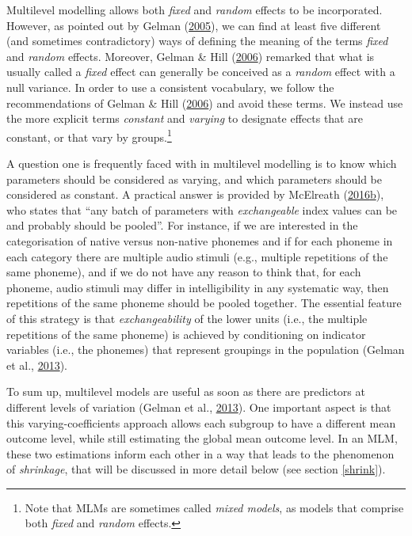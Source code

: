 \documentclass[a4paper,12pt,twoside,onecolumn,openright,final,oldfontcommands]{memoir}
\let\rmarkdownfootnote\footnote%
\def\footnote{\protect\rmarkdownfootnote}
\begin{document}
Multilevel modelling allows both \emph{fixed} and \emph{random} effects to be incorporated. However, as pointed out by Gelman (\protect\hyperlink{ref-gelman_analysis_2005}{2005}), we can find at least five different (and sometimes contradictory) ways of defining the meaning of the terms \emph{fixed} and \emph{random} effects. Moreover, Gelman \& Hill (\protect\hyperlink{ref-gelman_data_2006}{2006}) remarked that what is usually called a \emph{fixed} effect can generally be conceived as a \emph{random} effect with a null variance. In order to use a consistent vocabulary, we follow the recommendations of Gelman \& Hill (\protect\hyperlink{ref-gelman_data_2006}{2006}) and avoid these terms. We instead use the more explicit terms \emph{constant} and \emph{varying} to designate effects that are constant, or that vary by groups.\footnote{Note that MLMs are sometimes called \emph{mixed models}, as models that comprise both \emph{fixed} and \emph{random} effects.}

A question one is frequently faced with in multilevel modelling is to know which parameters should be considered as varying, and which parameters should be considered as constant. A practical answer is provided by McElreath (\protect\hyperlink{ref-mcelreath_statistical_2016}{2016}\protect\hyperlink{ref-mcelreath_statistical_2016}{b}), who states that \enquote{any batch of parameters with \emph{exchangeable} index values can be and probably should be pooled}. For instance, if we are interested in the categorisation of native versus non-native phonemes and if for each phoneme in each category there are multiple audio stimuli (e.g., multiple repetitions of the same phoneme), and if we do not have any reason to think that, for each phoneme, audio stimuli may differ in intelligibility in any systematic way, then repetitions of the same phoneme should be pooled together. The essential feature of this strategy is that \emph{exchangeability} of the lower units (i.e., the multiple repetitions of the same phoneme) is achieved by conditioning on indicator variables (i.e., the phonemes) that represent groupings in the population (Gelman et al., \protect\hyperlink{ref-gelman_bayesian_2013}{2013}).

To sum up, multilevel models are useful as soon as there are predictors at different levels of variation (Gelman et al., \protect\hyperlink{ref-gelman_bayesian_2013}{2013}). One important aspect is that this varying-coefficients approach allows each subgroup to have a different mean outcome level, while still estimating the global mean outcome level. In an MLM, these two estimations inform each other in a way that leads to the phenomenon of \emph{shrinkage}, that will be discussed in more detail below (see section \ref{shrink}).
\end{document}
